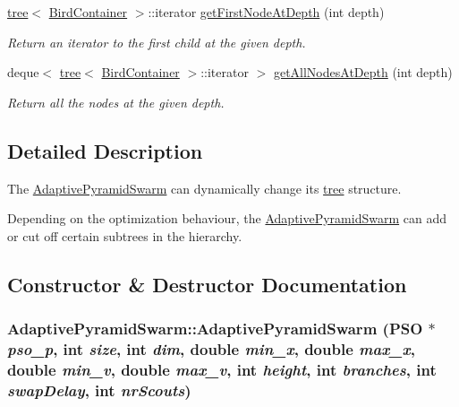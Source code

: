 \begin{CompactItemize}
\hyperlink{classtree}{tree}$<$ \hyperlink{structBirdContainer}{BirdContainer} $>$::iterator \hyperlink{classAdaptivePyramidSwarm_6d97c910723d05a6fd4c9aec4187b33b}{getFirstNodeAtDepth} (int depth)
\begin{CompactList}\small\item\em Return an iterator to the first child at the given depth. \item\end{CompactList}\item 
deque$<$ \hyperlink{classtree}{tree}$<$ \hyperlink{structBirdContainer}{BirdContainer} $>$::iterator $>$ \hyperlink{classAdaptivePyramidSwarm_9df13e57e0d7b380ae689a5bc7ae7c7f}{getAllNodesAtDepth} (int depth)
\begin{CompactList}\small\item\em Return all the nodes at the given depth. \item\end{CompactList}\end{CompactItemize}


\subsection{Detailed Description}
The \hyperlink{classAdaptivePyramidSwarm}{AdaptivePyramidSwarm} can dynamically change its \hyperlink{classtree}{tree} structure. 

Depending on the optimization behaviour, the \hyperlink{classAdaptivePyramidSwarm}{AdaptivePyramidSwarm} can add or cut off certain subtrees in the hierarchy. 

\subsection{Constructor \& Destructor Documentation}
\hypertarget{classAdaptivePyramidSwarm_859220f14a62847f77e03ef895b41673}{
\subsubsection{\setlength{\rightskip}{0pt plus 5cm}AdaptivePyramidSwarm::AdaptivePyramidSwarm ({\bf PSO} $\ast$ {\em pso\_\-p}, \/  int {\em size}, \/  int {\em dim}, \/  double {\em min\_\-x}, \/  double {\em max\_\-x}, \/  double {\em min\_\-v}, \/  double {\em max\_\-v}, \/  int {\em height}, \/  int {\em branches}, \/  int {\em swapDelay}, \/  int {\em nrScouts})}}
\label{classAdaptivePyramidSwarm_859220f14a62847f77e03ef895b41673}


